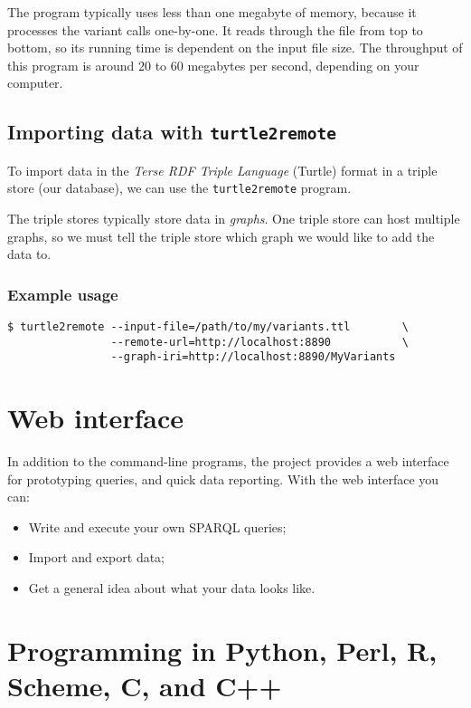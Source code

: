 \documentclass[11pt,a4paper]{book}
\begin{document}
  The program typically uses less than one megabyte of memory, because it
  processes the variant calls one-by-one.  It reads through the file from top
  to bottom, so its running time is dependent on the input file size.  The
  throughput of this program is around $20$ to $60$ megabytes per second,
  depending on your computer.

\label{sec:turtle2remote}
\section{Importing data with \texttt{turtle2remote}}

  To import data in the \emph{Terse RDF Triple Language} (Turtle) format in
  a triple store (our database), we can use the \texttt{turtle2remote} program.

  The triple stores typically store data in \emph{graphs}.  One triple store
  can host multiple graphs, so we must tell the triple store which graph we
  would like to add the data to.

\subsection{Example usage}

\begin{verbatim}
$ turtle2remote --input-file=/path/to/my/variants.ttl        \
                --remote-url=http://localhost:8890           \
                --graph-iri=http://localhost:8890/MyVariants
\end{verbatim}

\chapter{Web interface}

  In addition to the command-line programs, the project provides a web
  interface for prototyping queries, and quick data reporting.  With the
  web interface you can:
  \begin{itemize}
  \item Write and execute your own SPARQL queries;
  \item Import and export data;
  \item Get a general idea about what your data looks like.
  \end{itemize}

\chapter{Programming in Python, Perl, R, Scheme, C, and C++}
\end{document}

